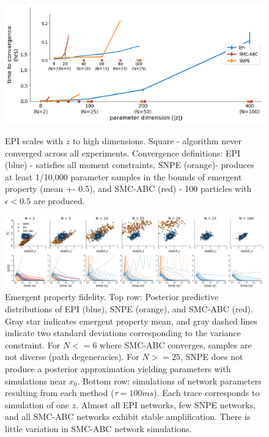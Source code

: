 \documentclass[11pt]{article}
\begin{document}
\begin{figure}[h]
\begin{center}
\includegraphics[scale=.4]{epi_both.png} \\
\end{center}
\caption{\small EPI scales with $z$ to high dimensions. 
Square - algorithm never converged across all experiments.
Convergence definitions: 
EPI (blue) - satisfies all moment constraints, 
SNPE (orange)- produces at least 1/10,000 parameter samples in the bounds of emergent property (mean +- 0.5), 
and SMC-ABC (red) - 100 particles with $\epsilon < 0.5$ are produced.}
\end{figure}

\begin{figure}[h]
\begin{center}
\includegraphics[scale=.3]{EPI_scaling3.png}
\caption{\small Emergent property fidelity.  Top row: Posterior predictive distributions of EPI (blue), SNPE (orange), and SMC-ABC (red). 
Gray star indicates emergent property mean, and gray dashed lines indicate two standard deviations corresponding to the variance constraint.
For $N <= 6$ where SMC-ABC converges, samples are not diverse (path degeneracies).  
For $N >= 25$, SNPE does not produce a posterior approximation yielding parameters with simulations near $x_0$. 
Bottom row: simulations of network parameters resulting from each method ($\tau=100ms$).  Each trace corresponds to simulation of one $z$.  
Almost all EPI networks, few SNPE networks, and all SMC-ABC networks exhibit stable amplification.  
There is little variation in SMC-ABC network simulations.}
\end{center}
\end{figure}



\end{document}
